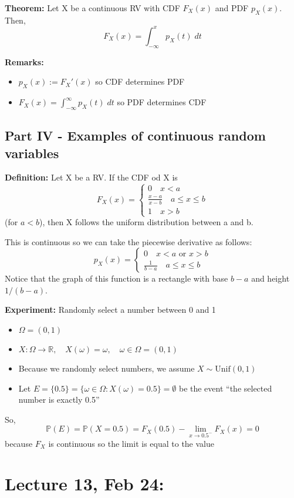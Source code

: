 \documentclass[12pt]{article}
\renewcommand{\P}{\mathbb{P}}
\begin{document}
\textbf{Theorem:} Let X be a continuous RV with CDF $F_X(x)$ and PDF $p_X(x)$. Then,
\[F_X(x) = \int_{-\infty}^x p_X(t) \; dt\]

\textbf{Remarks:}
\begin{itemize}
    \item $p_X(x) := F_X'(x)$ so CDF determines PDF
    \item $F_X(x) = \int_{-\infty}^\infty p_X(t)\; dt$ so PDF determines CDF
\end{itemize}

\subsection*{Part IV - Examples of continuous random variables}
\textbf{Definition:} Let X be a RV. If the CDF od X is 
\[F_X(x) = \begin{cases}
    0 \quad x < a\\
    \frac{x-a}{x- b} \quad a \leq x \leq b\\
    1 \quad x > b
\end{cases}\] 
(for $a < b$), then X follows the uniform distribution between a and b.

This is continuous so we can take the piecewise derivative as follows:
\[p_X(x) = \begin{cases}
    0 \quad x < a \text{ or } x > b\\
    \frac{1}{b - a} \quad a \leq x \leq b
\end{cases}\]
Notice that the graph of this function is a rectangle with base $b-a$ and height $1/(b-a)$.

\textbf{Experiment:} Randomly select a number between 0 and 1
\begin{itemize}
    \item $\Omega = (0, 1)$
    \item $X : \Omega \to \mathbb{R}, \quad X(\omega) = \omega, \quad \omega \in \Omega = (0, 1)$
    \item Because we randomly select numbers, we assume $X \sim \text{Unif}(0, 1)$
    \item Let $E = \{0.5\} = \{\omega \in \Omega: X(\omega) = 0.5\} = \emptyset$ be the event ``the selected number is exactly 0.5''
\end{itemize}
So, 
\[\P(E) = \P(X = 0.5) = F_X(0.5) - \lim_{x \to 0.5^-} F_X(x) = 0\]
because $F_X$ is continuous so the limit is equal to the value

\section*{Lecture 13, Feb 24: }
\end{document}
